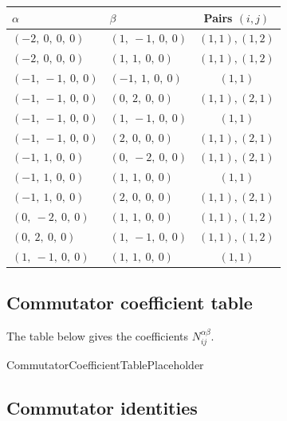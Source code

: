 \documentclass[11pt]{article}
\newcommand{\noi}{\noindent}
\theoremstyle{definition}
\begin{document}
\begin{tabular}{|l|l|c|}
    \hline
    $\alpha$ & $\beta$ & Pairs $(i,j)$ \\
    \hline
    $\left( -2, \  0, \  0, \  0\right)$ & $\left( 1, \  -1, \  0, \  0\right)$ & $(1,1), (1,2)$ \\
    \hline
    $\left( -2, \  0, \  0, \  0\right)$ & $\left( 1, \  1, \  0, \  0\right)$ & $(1,1), (1,2)$ \\
    \hline
    $\left( -1, \  -1, \  0, \  0\right)$ & $\left( -1, \  1, \  0, \  0\right)$ & $(1,1)$ \\
    \hline
    $\left( -1, \  -1, \  0, \  0\right)$ & $\left( 0, \  2, \  0, \  0\right)$ & $(1,1), (2,1)$ \\
    \hline
    $\left( -1, \  -1, \  0, \  0\right)$ & $\left( 1, \  -1, \  0, \  0\right)$ & $(1,1)$ \\
    \hline
    $\left( -1, \  -1, \  0, \  0\right)$ & $\left( 2, \  0, \  0, \  0\right)$ & $(1,1), (2,1)$ \\
    \hline
    $\left( -1, \  1, \  0, \  0\right)$ & $\left( 0, \  -2, \  0, \  0\right)$ & $(1,1), (2,1)$ \\
    \hline
    $\left( -1, \  1, \  0, \  0\right)$ & $\left( 1, \  1, \  0, \  0\right)$ & $(1,1)$ \\
    \hline
    $\left( -1, \  1, \  0, \  0\right)$ & $\left( 2, \  0, \  0, \  0\right)$ & $(1,1), (2,1)$ \\
    \hline
    $\left( 0, \  -2, \  0, \  0\right)$ & $\left( 1, \  1, \  0, \  0\right)$ & $(1,1), (1,2)$ \\
    \hline
    $\left( 0, \  2, \  0, \  0\right)$ & $\left( 1, \  -1, \  0, \  0\right)$ & $(1,1), (1,2)$ \\
    \hline
    $\left( 1, \  -1, \  0, \  0\right)$ & $\left( 1, \  1, \  0, \  0\right)$ & $(1,1)$ \\
    \hline
\end{tabular}


\subsection{Commutator coefficient table}

\noi The table below gives the coefficients $N_{ij}^{\alpha\beta}$.

CommutatorCoefficientTablePlaceholder

\subsection{Commutator identities}
\end{document}
